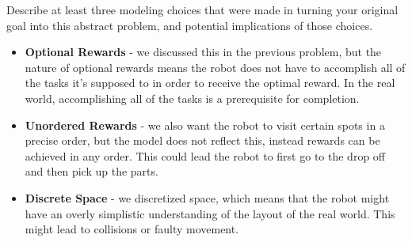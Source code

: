 \documentclass[expanded]{lkx_pset}
\begin{document}
\begin{solution}
	\begin{part}{8} Describe at least three modeling choices that were made in
		turning your original goal into this abstract problem, and
		potential implications of those choices.
	\end{part}

	\begin{itemize}
		\item \textbf{Optional Rewards} - we discussed this in the previous problem, but the nature of optional rewards means the robot does not have to accomplish all of the tasks it's supposed to in order to receive the optimal reward. In the real world, accomplishing all of the tasks is a prerequisite for completion.
		\item \textbf{Unordered Rewards} - we also want the robot to visit certain spots in a precise order, but the model does not reflect this, instead rewards can be achieved in any order. This could lead the robot to first go to the drop off and then pick up the parts.
		\item \textbf{Discrete Space} - we discretized space, which means that the robot might have an overly simplistic understanding of the layout of the real world. This might lead to collisions or faulty movement.
	\end{itemize}
\end{solution}
\end{document}
